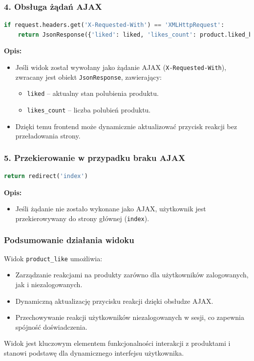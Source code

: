 \documentclass[12pt,a4paper,oneside]{article}
\theoremstyle{definition}
\numberwithin{equation}{section}
\begin{document}
\subsubsection*{4. Obsługa żądań AJAX}
\begin{lstlisting}[language=Python, caption=Fragment kodu: Obsługa żądań AJAX]
if request.headers.get('X-Requested-With') == 'XMLHttpRequest':
    return JsonResponse({'liked': liked, 'likes_count': product.liked_by.count()})
\end{lstlisting}
\textbf{Opis:}
\begin{itemize}
    \item Jeśli widok został wywołany jako żądanie AJAX (\texttt{X-Requested-With}), zwracany jest obiekt \texttt{JsonResponse}, zawierający:
    \begin{itemize}
        \item \texttt{liked} – aktualny stan polubienia produktu.
        \item \texttt{likes\_count} – liczba polubień produktu.
    \end{itemize}
    \item Dzięki temu frontend może dynamicznie aktualizować przycisk reakcji bez przeładowania strony.
\end{itemize}

\subsubsection*{5. Przekierowanie w przypadku braku AJAX}
\begin{lstlisting}[language=Python, caption=Fragment kodu: Przekierowanie w przypadku braku AJAX]
return redirect('index')
\end{lstlisting}
\textbf{Opis:}
\begin{itemize}
    \item Jeśli żądanie nie zostało wykonane jako AJAX, użytkownik jest przekierowywany do strony głównej (\texttt{index}).
\end{itemize}

\subsubsection*{Podsumowanie działania widoku}
Widok \texttt{product\_like} umożliwia:
\begin{itemize}
    \item Zarządzanie reakcjami na produkty zarówno dla użytkowników zalogowanych, jak i niezalogowanych.
    \item Dynamiczną aktualizację przycisku reakcji dzięki obsłudze AJAX.
    \item Przechowywanie reakcji użytkowników niezalogowanych w sesji, co zapewnia spójność doświadczenia.
\end{itemize}
Widok jest kluczowym elementem funkcjonalności interakcji z produktami i stanowi podstawę dla dynamicznego interfejsu użytkownika.
\end{document}
